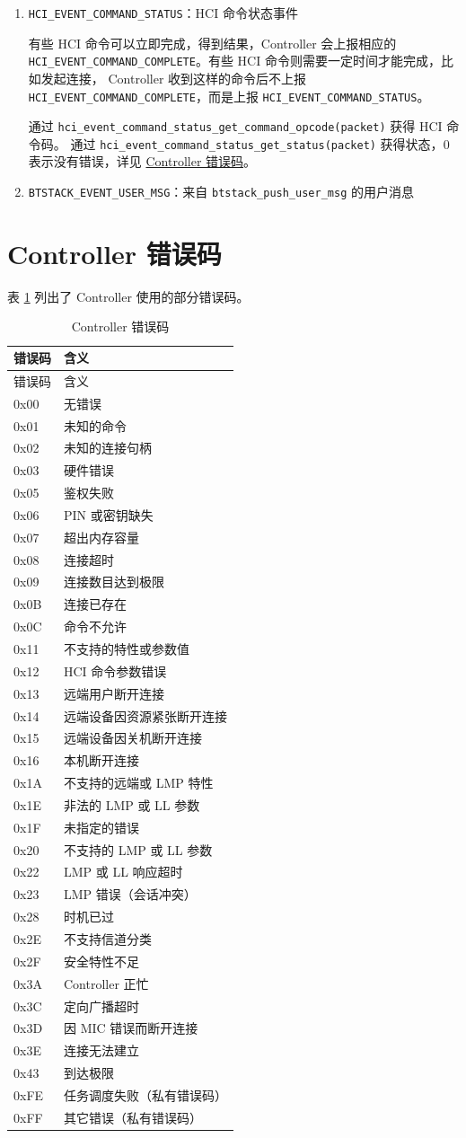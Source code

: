 \documentclass[
  12pt,
]{book}
\begin{document}
\begin{enumerate}
  通过 \texttt{hci\_event\_command\_complete\_get\_command\_opcode(packet)} 获得 HCI 命令码。
  通过 \texttt{hci\_event\_command\_complete\_get\_return\_parameters(packet)} 获得 Controller 返回的参数，其中第 1 个字节为命令完成的状态，
  \(0\) 表示没有错误，详见 \protect\hyperlink{ch-ctrl-err-code}{Controller 错误码}。其它参数需要根据命令码做具体分析。
\item
  \texttt{HCI\_EVENT\_COMMAND\_STATUS}：HCI 命令状态事件

  有些 HCI 命令可以立即完成，得到结果，Controller 会上报相应的 \texttt{HCI\_EVENT\_COMMAND\_COMPLETE}。有些 HCI 命令则需要一定时间才能完成，比如发起连接，
  Controller 收到这样的命令后不上报 \texttt{HCI\_EVENT\_COMMAND\_COMPLETE}，而是上报 \texttt{HCI\_EVENT\_COMMAND\_STATUS}。

  通过 \texttt{hci\_event\_command\_status\_get\_command\_opcode(packet)} 获得 HCI 命令码。
  通过 \texttt{hci\_event\_command\_status\_get\_status(packet)} 获得状态，\(0\) 表示没有错误，详见 \protect\hyperlink{ch-ctrl-err-code}{Controller 错误码}。
\item
  \texttt{BTSTACK\_EVENT\_USER\_MSG}：来自 \texttt{btstack\_push\_user\_msg} 的用户消息
\end{enumerate}

\hypertarget{ch-ctrl-err-code}{%
\section{Controller 错误码}\label{ch-ctrl-err-code}}

表 \ref{tab:ch0-ctrl-err-code} 列出了 Controller 使用的部分错误码。

\begin{longtable}[]{@{}ll@{}}
\caption{\label{tab:ch0-ctrl-err-code} Controller 错误码}\tabularnewline
\toprule
错误码 & 含义\tabularnewline
\midrule
\endfirsthead
\toprule
错误码 & 含义\tabularnewline
\midrule
\endhead
0x00 & 无错误\tabularnewline
0x01 & 未知的命令\tabularnewline
0x02 & 未知的连接句柄\tabularnewline
0x03 & 硬件错误\tabularnewline
0x05 & 鉴权失败\tabularnewline
0x06 & PIN 或密钥缺失\tabularnewline
0x07 & 超出内存容量\tabularnewline
0x08 & 连接超时\tabularnewline
0x09 & 连接数目达到极限\tabularnewline
0x0B & 连接已存在\tabularnewline
0x0C & 命令不允许\tabularnewline
0x11 & 不支持的特性或参数值\tabularnewline
0x12 & HCI 命令参数错误\tabularnewline
0x13 & 远端用户断开连接\tabularnewline
0x14 & 远端设备因资源紧张断开连接\tabularnewline
0x15 & 远端设备因关机断开连接\tabularnewline
0x16 & 本机断开连接\tabularnewline
0x1A & 不支持的远端或 LMP 特性\tabularnewline
0x1E & 非法的 LMP 或 LL 参数\tabularnewline
0x1F & 未指定的错误\tabularnewline
0x20 & 不支持的 LMP 或 LL 参数\tabularnewline
0x22 & LMP 或 LL 响应超时\tabularnewline
0x23 & LMP 错误（会话冲突）\tabularnewline
0x28 & 时机已过\tabularnewline
0x2E & 不支持信道分类\tabularnewline
0x2F & 安全特性不足\tabularnewline
0x3A & Controller 正忙\tabularnewline
0x3C & 定向广播超时\tabularnewline
0x3D & 因 MIC 错误而断开连接\tabularnewline
0x3E & 连接无法建立\tabularnewline
0x43 & 到达极限\tabularnewline
0xFE & 任务调度失败（私有错误码）\tabularnewline
0xFF & 其它错误（私有错误码）\tabularnewline
\bottomrule
\end{longtable}
\end{document}
